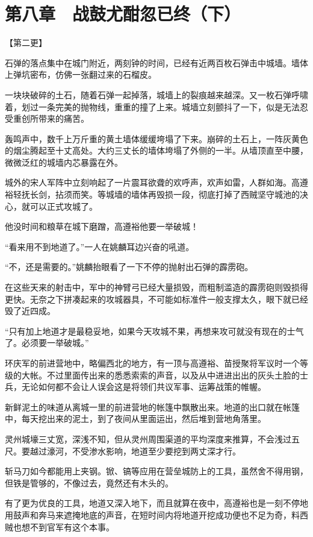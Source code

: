 \section{第八章　战鼓尤酣忽已终（下）}

【第二更】

石弹的落点集中在城门附近，两刻钟的时间，已经有近两百枚石弹击中城墙。墙体上弹坑密布，仿佛一张翻过来的石榴皮。

一块块破碎的土石，随着石弹一起掉落，城墙上的裂痕越来越深。又一枚石弹呼啸着，划过一条完美的抛物线，重重的撞了上来。城墙立刻颤抖了一下，似是无法忍受重创所带来的痛苦。

轰鸣声中，数千上万斤重的黄土墙体缓缓垮塌了下来。崩碎的土石上，一阵灰黄色的烟尘腾起至十丈高处。大约三丈长的墙体垮塌了外侧的一半。从墙顶直至中腰，微微泛红的城墙内芯暴露在外。

城外的宋人军阵中立刻响起了一片震耳欲聋的欢呼声，欢声如雷，人群如海。高遵裕轻抚长剑，拈须而笑。等城墙的墙体再毁损一段，彻底打掉了西贼坚守城池的决心，就可以正式攻城了。

他没时间和粮草在城下磨蹭，高遵裕他要一举破城！

“看来用不到地道了。”一人在姚麟耳边兴奋的吼道。

“不，还是需要的。”姚麟抬眼看了一下不停的抛射出石弹的霹雳砲。

在这些天来的射击中，军中的神臂弓已经大量损毁，而粗制滥造的霹雳砲则毁损得更快。无奈之下拼凑起来的攻城器具，不可能如标准件一般支撑太久，眼下就已经毁了近四成。

“只有加上地道才是最稳妥地，如果今天攻城不果，再想来攻可就没有现在的士气了。必须要一举破城。”

环庆军的前进营地中，略偏西北的地方，有一顶与高遵裕、苗授聚将军议时一个等级的大帐。不过里面传出来的悉悉索索的声音，以及从中进进出出的灰头土脸的士兵，无论如何都不会让人误会这是将领们共议军事、运筹战策的帷幄。

新鲜泥土的味道从离城一里的前进营地的帐篷中飘散出来。地道的出口就在帐篷中，每天挖出来的泥土，到了夜间从里面运出，然后堆到营地角落里。

灵州城壕三丈宽，深浅不知，但从灵州周围渠道的平均深度来推算，不会浅过五尺。要越过濠河，不受渗水影响，地道至少要挖到两丈深才行。

斩马刀如今都能用上夹钢。锨、镐等应用在营垒城防上的工具，虽然舍不得用钢，但铁是管够的，不像过去，竟然还有木头的。

有了更为优良的工具，地道又深入地下，而且就算在夜中，高遵裕也是一刻不停地用鼓声和奔马来遮掩地底的声音，在短时间内将地道开挖成功便也不足为奇，料西贼也想不到官军有这个本事。

